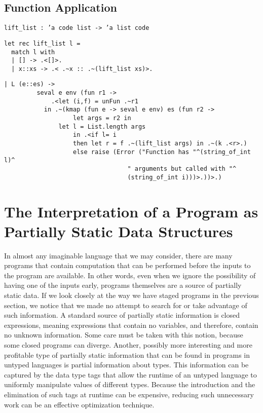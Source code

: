 \documentclass[10pt,a4paper]{jarticle}
\theoremstyle{definition}
\begin{document}
\subsection{Function Application}

{\small
\begin{verbatim}
lift_list : ’a code list -> ’a list code
\end{verbatim}}

{\small
\begin{verbatim}
let rec lift_list l =
  match l with
  | [] -> .<[]>.
  | x::xs -> .< .~x :: .~(lift_list xs)>.
\end{verbatim}}

{\small
\begin{verbatim}
| L (e::es) ->
	     seval e env (fun r1 ->
	         .<let (i,f) = unFun .~r1
           in .~(kmap (fun e -> seval e env) es (fun r2 ->
		           let args = r2 in
               let l = List.length args
		           in .<if l= i
		           then let r = f .~(lift_list args) in .~(k .<r>.)
		           else raise (Error ("Function has "^(string_of_int l)^
                                  " arguments but called with "^
                                  (string_of_int i)))>.))>.)
\end{verbatim}}


\section{The Interpretation of a Program as Partially Static Data Structures}

In almost any imaginable language that we may consider, there are many programs that contain computation that can be performed before the inputs to the program are available. In other words, even when we ignore the possibility of having one of the inputs early, programs themselves are a source of partially static data. If we look closely at the way we have staged programs in the previous section, we notice that we made no attempt to search for or take advantage of such information. A standard source of partially static information is closed expressions, meaning expressions that contain no variables, and therefore, contain no unknown information. Some care must be taken with this notion, because some closed programs can diverge. Another, possibly more interesting and more profitable type of partially static information that can be found in programs in untyped languages is partial information about types. This information can be captured by the data type tags that allow the runtime of an untyped language to uniformly manipulate values of different types. Because the introduction and the elimination of such tags at runtime can be expensive, reducing such unnecessary work can be an effective optimization technique.
\end{document}
